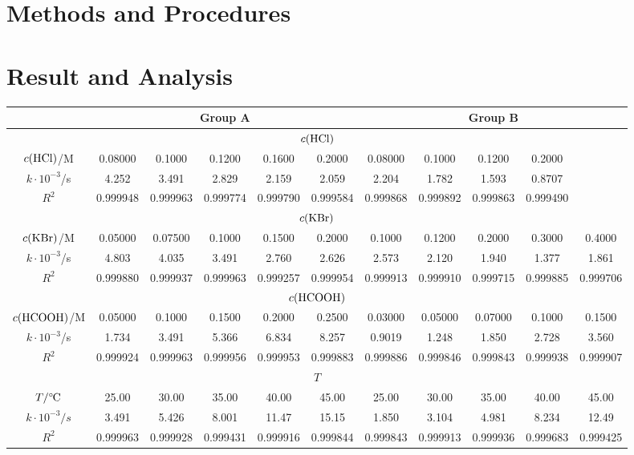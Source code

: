 \documentclass[%
 reprint,
 amsmath,amssymb,
 aps,
10.5pt,
]{revtex4-1}
\newcommand{\celsius}{\ensuremath{^\circ\hspace{-0.09em}\mathrm{C}}}
\begin{document}
\section{Methods and Procedures}




\section{Result and Analysis}

\begin{table}
\begin{tabular}{c|ccccc|ccccc}\hline
& \multicolumn{5}{c|}{Group A} & \multicolumn{5}{c}{Group B} \\\hline
\multicolumn{11}{c}{$c(\ce{HCl})$} \\\hline
 $c(\ce{HCl})$/M & 0.08000 & 0.1000 & 0.1200 & 0.1600 & 0.2000 & 0.08000 & 0.1000 & 0.1200 & 0.2000 &\\
 $k \cdot 10^{-3}$/s & 4.252 & 3.491 & 2.829 & 2.159 &
   2.059 & 2.204 & 1.782 & 1.593 & 0.8707 &\\
   $R^2$ & 0.999948 & 0.999963 & 0.999774 & 0.999790 & 0.999584 & 0.999868 & 0.999892 & 0.999863 & 0.999490 &\\\hline
 \multicolumn{11}{c}{$c(\ce{KBr})$} \\\hline
 $c(\ce{KBr})$/M & 0.05000 & 0.07500 & 0.1000 & 0.1500 & 0.2000 & 0.1000 & 0.1200 & 0.2000 & 0.3000 & 0.4000\\
 $k \cdot 10^{-3}$/s &  4.803 & 4.035 & 3.491 & 2.760 & 2.626 & 2.573 & 2.120 & 1.940 & 1.377 & 1.861\\
 $R^2$ & 0.999880 & 0.999937 & 0.999963 & 0.999257 & 0.999954 & 0.999913 & 0.999910 & 0.999715 & 0.999885 &
   0.999706 \\\hline
 \multicolumn{11}{c}{$c(\ce{HCOOH})$} \\\hline
 $c(\ce{HCOOH})$/M & 0.05000 & 0.1000 & 0.1500 & 0.2000 & 0.2500 & 0.03000 & 0.05000 & 0.07000 & 0.1000 & 0.1500 \\
 $k \cdot 10^{-3}$/s & 1.734 & 3.491 & 5.366 & 6.834 & 8.257 & 0.9019 & 1.248 & 1.850 & 2.728 & 3.560 \\
 $R^2$ & 0.999924 & 0.999963 & 0.999956 & 0.999953 &
   0.999883 & 0.999886 & 0.999846 & 0.999843 & 0.999938 &
   0.999907\\\hline
 \multicolumn{11}{c}{$T$} \\\hline
 $T/\celsius$ & 25.00 & 30.00 & 35.00 & 40.00 & 45.00 & 25.00 & 30.00 & 35.00 & 40.00 & 45.00\\
 $k \cdot 10^{-3}/s$ &  3.491 & 5.426 & 8.001 & 11.47 & 15.15 & 1.850 & 3.104 & 4.981 & 8.234 & 12.49 \\
 $R^2$ & 0.999963 & 0.999928 & 0.999431 & 0.999916 &
   0.999844 & 0.999843 & 0.999913 & 0.999936 & 0.999683 &
   0.999425 \\\hline
\end{tabular}
\end{table}
\end{document}
